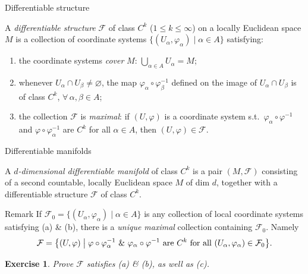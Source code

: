 \documentclass[10pt]{beamer}
\newtheorem{exercise}{Exercise}
\newcommand{\F}{\mathcal{F}}
\begin{document}
\begin{frame}{Differentiable structure}
	\begin{definition}
		A \emph{differentiable structure} $\F$ of class $C^k$
		($1 \leq k \leq \infty$) on a locally Euclidean space $M$ is a
		collection of coordinate systems
		$\{(U_\alpha, \varphi_\alpha) \mid \alpha \in A\}$ satisfying:
		\begin{enumerate}
			\item[(a)] the coordinate systems \emph{cover} $M$:
			      $\displaystyle\bigcup_{\alpha \in A} U_\alpha = M$;
			\item[(b)] whenever $U_\alpha \cap U_\beta \neq \varnothing$, the map
			      $\varphi_\alpha \circ \varphi_\beta^{-1}$ defined on the image of
			      $U_\alpha \cap U_\beta$ is of class $C^k$,
			      $\forall\, \alpha, \beta \in A$;
			\item[(c)] the collection $\F$ is \emph{maximal}: if $(U, \varphi)$ is
			      a coordinate system s.t.\ $\varphi_\alpha \circ \varphi^{-1}$ and
			      $\varphi \circ \varphi_\alpha^{-1}$ are $C^k$ for all
			      $\alpha \in A$, then $(U, \varphi) \in \F$.
		\end{enumerate}
	\end{definition}
\end{frame}

\begin{frame}{Differentiable manifolds}
	\begin{definition}
		A \emph{$d$-dimensional differentiable manifold} of class $C^k$ is a
		pair $(M, \F)$ consisting of a second countable, locally Euclidean space
		$M$ of dim $d$, together with a differentiable structure $\F$ of class
		$C^k$.
	\end{definition}
	\begin{block}{Remark}
		If $\F_0 = \{(U_\alpha, \varphi_\alpha) \mid \alpha \in A\}$ is any
		collection of local coordinate systems satisfying (a) \& (b), there is a
		\emph{unique maximal} collection containing $\F_0$. Namely
		\[
			\F = \bigl\{ (U, \varphi) \bigm|
			\varphi \circ \varphi_\alpha^{-1} \ \&\ \varphi_\alpha \circ \varphi^{-1}
			\text{ are } C^k \text{ for all } (U_\alpha, \varphi_\alpha) \in \F_0 \bigr\}.
		\]
	\end{block}
	\begin{exercise}
		Prove $\F$ satisfies (a) \& (b), as well as (c).
	\end{exercise}
\end{frame}
\end{document}
